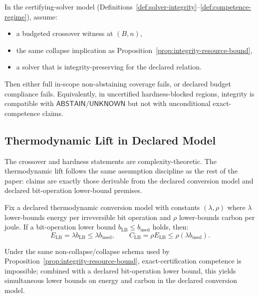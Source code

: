 \begin{proposition}\label{prop:crossover-policy}
In the certifying-solver model (Definitions~\ref{def:solver-integrity}--\ref{def:competence-regime}), assume:
\begin{itemize}
\item a budgeted crossover witness at $(B,n)$,
\item the same collapse implication as Proposition~\ref{prop:integrity-resource-bound},
\item a solver that is integrity-preserving for the declared relation.
\end{itemize}
Then either full in-scope non-abstaining coverage fails, or declared budget compliance fails.
Equivalently, in uncertified hardness-blocked regions, integrity is compatible with $\mathsf{ABSTAIN}/\mathsf{UNKNOWN}$ but not with unconditional exact-competence claims.
\end{proposition}

\subsection{Thermodynamic Lift in Declared Model}
The crossover and hardness statements are complexity-theoretic.
The thermodynamic lift follows the same assumption discipline as the rest of the paper:
claims are exactly those derivable from the declared conversion model and declared bit-operation lower-bound premises.

\begin{proposition}\label{prop:thermo-lift}
Fix a declared thermodynamic conversion model with constants $(\lambda,\rho)$ where $\lambda$ lower-bounds energy per irreversible bit operation and $\rho$ lower-bounds carbon per joule. If a bit-operation lower bound $b_{\mathrm{LB}} \le b_{\mathrm{used}}$ holds, then:
\[
E_{\mathrm{LB}}=\lambda b_{\mathrm{LB}} \le \lambda b_{\mathrm{used}},\qquad
C_{\mathrm{LB}}=\rho E_{\mathrm{LB}} \le \rho(\lambda b_{\mathrm{used}}).
\]
\end{proposition}

\begin{proposition}\label{prop:thermo-hardness-bundle}
Under the same non-collapse/collapse schema used by Proposition~\ref{prop:integrity-resource-bound}, exact-certification competence is impossible; combined with a declared bit-operation lower bound, this yields simultaneous lower bounds on energy and carbon in the declared conversion model.
\end{proposition}

